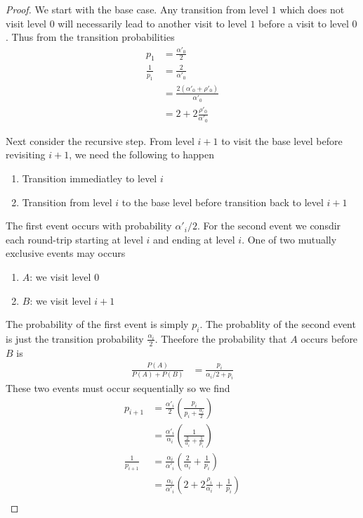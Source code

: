 \documentclass{article}
\begin{document}
\begin{proof}
We start with the base case. Any transition from level $1$ which does not visit
level $0$ will necessarily lead to another visit to level $1$ before a visit to
level $0$. Thus from the transition probabilities
\begin{align*}
p_1 &= \frac{\alpha'_0}{2} \\
\frac{1}{p_1} &= \frac{2}{\alpha'_0} \\
&= \frac{2(\alpha'_0+\rho'_0)}{\alpha'_0} \\
&= 2 + 2\frac{\rho'_0}{\alpha'_0}
\end{align*}

Next consider the recursive step. From level $i+1$ to visit the base level
before revisiting $i+1$, we need the following to happen 
\begin{enumerate}
    \item Transition immediatley to level $i$
    \item Transition from level $i$ to the base level before transition back to
    level $i+1$
\end{enumerate}
The first event occurs with probability $\alpha'_i/2$. For the second event we
consdir each round-trip starting at level $i$ and ending at level $i$. One
of two mutually exclusive events may occurs
\begin{enumerate}
    \item $A$: we visit level $0$
    \item $B$: we visit level $i+1$
\end{enumerate}
The probability of the first event is simply $p_i$. The probablity of the second
event is just the transition probability $\frac{\alpha_i}{2}$. Theefore the
probability that $A$ occurs before $B$ is 
\begin{align*}
\frac{P(A)}{P(A)+P(B)} &= \frac{p_i}{\alpha_{i}/2 + p_i}
\end{align*}
These two events must occur sequentially so we find 
\begin{align*}
p_{i+1} &= \frac{\alpha'_i}{2}\left(\frac{p_i}{p_i+\frac{\alpha_i}{2}}\right) \\
&= \frac{\alpha'_i}{\alpha_i}\left(\frac{1}{\frac{2}{\alpha_i}+\frac{1}{p_i}}\right) \\
\frac{1}{p_{i+1}}&= \frac{\alpha_i}{\alpha'_i}\left(\frac{2}{\alpha_i}+\frac{1}{p_i}\right) \\
&= \frac{\alpha_i}{\alpha'_i}\left(2+2\frac{\rho_i}{\alpha_i}+\frac{1}{p_i}\right) \\ 
\end{align*}
\end{proof}
\end{document}

